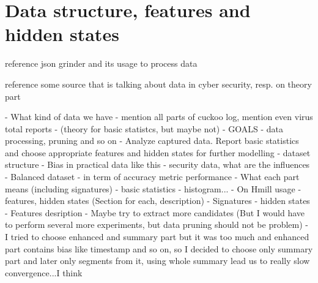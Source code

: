 \chapter{Data structure, features and hidden states}

reference json grinder and its usage to process data

reference some source that is talking about data in cyber security, resp. on theory part

- What kind of data we have - mention all parts of cuckoo log, mention even virus total reports
- (theory for basic statistcs, but maybe not)
- GOALS
  - data processing, pruning and so on
  - Analyze captured data. Report basic statistics and choose appropriate features and hidden states for further modelling
- dataset structure
  - Bias in practical data like this - security data, what are the influences
  - Balanced dataset - in term of accuracy metric performance
  - What each part means (including signatures)
- basic statistics - histogram...
- On Hmill usage - features, hidden states (Section for each, description)
- Signatures - hidden states
- Features  desription
- Maybe try to extract more candidates (But I would have to perform several more experiments, but data pruning should not be problem)
  - I tried to choose enhanced and summary part but it was too much and enhanced part contains bias like timestamp and so on, so I decided to choose only summary part and later only segments from it, using whole summary lead us to really slow convergence...I think
